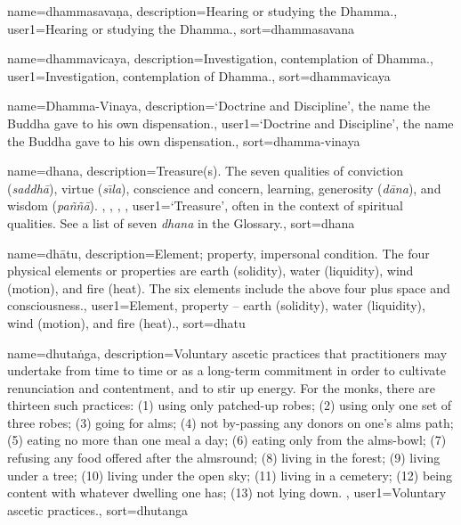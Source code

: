 {
name=dhammasava\d{n}a,
description={Hearing or studying the Dhamma.},
user1={Hearing or studying the Dhamma.},
sort={dhammasavana}
}

{
name=dhammavicaya,
description={Investigation, contemplation of Dhamma.},
user1={Investigation, contemplation of Dhamma.},
sort={dhammavicaya}
}

{
name=Dhamma-Vinaya,
description={`Doctrine and Discipline', the name the Buddha gave to his own dispensation.},
user1={`Doctrine and Discipline', the name the Buddha gave to his own dispensation.},
sort={dhamma-vinaya}
}

{
name={dhana},
description={Treasure(s). The seven qualities of conviction (\textit{saddh\=a}), virtue (\textit{s\={\i}la}), conscience and concern, learning, generosity (\textit{d\=ana}), and wisdom (\textit{pa\~n\~n\=a}). \protect \seepre %
\protect {}, \protect {}, \protect {}, \protect {}%
\protect \seepost %
},
user1={`Treasure', often in the context of spiritual qualities. See a list of seven \textit{dhana} in the Glossary.},
sort={dhana}
}

{
name={dh\=atu},
description={Element; property, impersonal condition. The four physical elements or properties are earth (solidity), water (liquidity), wind (motion), and fire (heat). The six elements include the above four plus space and consciousness.},
user1={Element, property -- earth (solidity), water (liquidity), wind (motion), and fire (heat).},
sort={dhatu}
}

{
name={dhuta\.nga},
description={Voluntary ascetic practices that practitioners may undertake from time to time or as a long-term commitment in order to cultivate renunciation and contentment, and to stir up energy. For the monks, there are thirteen such practices: (1) using only patched-up robes; (2) using only one set of three robes; (3) going for alms; (4) not by-passing any donors on one's alms path; (5) eating no more than one meal a day; (6) eating only from the alms-bowl; (7) refusing any food offered after the almsround; (8) living in the forest; (9) living under a tree; (10) living under the open sky; (11) living in a cemetery; (12) being content with whatever dwelling one has; (13) not lying down. \protect \seepre %
\protect {}%
\protect \seepost %
},
user1={Voluntary ascetic practices.},
sort={dhutanga}
}

